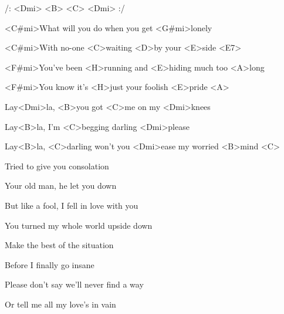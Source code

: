 

/: <Dmi> <B> <C> <Dmi> :/

\zs
<C#mi>What will you do when you get <G#mi>lonely

<C#mi>With no-one <C>waiting <D>by your <E>side <E7>

<F#mi>You've been <H>running and <E>hiding much too <A>long

<F#mi>You know it's <H>just your foolish <E>pride <A>
\ks

\zr
Lay<Dmi>la, <B>you got <C>me on my <Dmi>knees

Lay<B>la, I'm <C>begging darling <Dmi>please

Lay<B>la, <C>darling won't you <Dmi>ease my worried <B>mind <C>
\kr

\zs
Tried to give you consolation

Your old man, he let you down

But like a fool, I fell in love with you

You turned my whole world upside down
\ks

\zr \kr

\zs
Make the best of the situation

Before I finally go insane

Please don't say we'll never find a way

Or tell me all my love's in vain
\ks

\zr \kr

\kp
